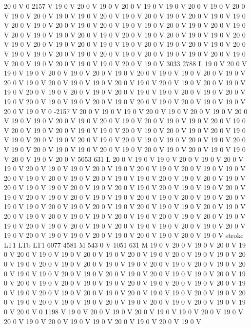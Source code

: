 {{20 0 V
0 2157 V
19 0 V
20 0 V
19 0 V
20 0 V
19 0 V
19 0 V
20 0 V
19 0 V
20 0 V
19 0 V
20 0 V
19 0 V
19 0 V
20 0 V
19 0 V
20 0 V
19 0 V
20 0 V
19 0 V
19 0 V
20 0 V
19 0 V
20 0 V
19 0 V
20 0 V
19 0 V
19 0 V
20 0 V
19 0 V
20 0 V
19 0 V
20 0 V
19 0 V
19 0 V
20 0 V
19 0 V
20 0 V
19 0 V
20 0 V
19 0 V
19 0 V
20 0 V
19 0 V
20 0 V
19 0 V
20 0 V
19 0 V
19 0 V
20 0 V
19 0 V
20 0 V
19 0 V
20 0 V
19 0 V
19 0 V
20 0 V
19 0 V
20 0 V
19 0 V
20 0 V
19 0 V
19 0 V
20 0 V
19 0 V
20 0 V
19 0 V
20 0 V
19 0 V
19 0 V
20 0 V
19 0 V
3033 2788 L
19 0 V
20 0 V
19 0 V
19 0 V
20 0 V
19 0 V
20 0 V
19 0 V
20 0 V
19 0 V
19 0 V
20 0 V
19 0 V
20 0 V
19 0 V
20 0 V
19 0 V
19 0 V
20 0 V
19 0 V
20 0 V
19 0 V
20 0 V
19 0 V
19 0 V
20 0 V
19 0 V
20 0 V
19 0 V
20 0 V
19 0 V
19 0 V
20 0 V
19 0 V
20 0 V
19 0 V
20 0 V
19 0 V
19 0 V
20 0 V
19 0 V
20 0 V
19 0 V
20 0 V
19 0 V
19 0 V
20 0 V
19 0 V
0 -2157 V
20 0 V
19 0 V
19 0 V
20 0 V
19 0 V
20 0 V
19 0 V
20 0 V
19 0 V
19 0 V
20 0 V
19 0 V
20 0 V
19 0 V
20 0 V
19 0 V
19 0 V
20 0 V
19 0 V
20 0 V
19 0 V
20 0 V
19 0 V
19 0 V
20 0 V
19 0 V
20 0 V
19 0 V
20 0 V
19 0 V
19 0 V
20 0 V
19 0 V
20 0 V
19 0 V
20 0 V
19 0 V
19 0 V
20 0 V
19 0 V
20 0 V
19 0 V
20 0 V
19 0 V
19 0 V
20 0 V
19 0 V
20 0 V
19 0 V
20 0 V
19 0 V
19 0 V
20 0 V
19 0 V
20 0 V
5053 631 L
20 0 V
19 0 V
19 0 V
20 0 V
19 0 V
20 0 V
19 0 V
20 0 V
19 0 V
19 0 V
20 0 V
19 0 V
20 0 V
19 0 V
20 0 V
19 0 V
19 0 V
20 0 V
19 0 V
20 0 V
19 0 V
20 0 V
19 0 V
19 0 V
20 0 V
19 0 V
20 0 V
19 0 V
20 0 V
19 0 V
19 0 V
20 0 V
19 0 V
20 0 V
19 0 V
20 0 V
19 0 V
19 0 V
20 0 V
19 0 V
20 0 V
19 0 V
20 0 V
19 0 V
19 0 V
20 0 V
19 0 V
20 0 V
19 0 V
20 0 V
19 0 V
19 0 V
20 0 V
19 0 V
20 0 V
19 0 V
20 0 V
19 0 V
19 0 V
20 0 V
19 0 V
20 0 V
19 0 V
20 0 V
19 0 V
19 0 V
20 0 V
19 0 V
20 0 V
19 0 V
20 0 V
19 0 V
19 0 V
20 0 V
19 0 V
20 0 V
19 0 V
20 0 V
19 0 V
19 0 V
20 0 V
19 0 V
20 0 V
19 0 V
20 0 V
19 0 V
19 0 V
20 0 V
19 0 V
20 0 V
19 0 V
20 0 V
19 0 V
stroke
LT1
LTb
LT1
6077 4581 M
543 0 V
1051 631 M
19 0 V
20 0 V
19 0 V
20 0 V
19 0 V
20 0 V
19 0 V
19 0 V
20 0 V
19 0 V
20 0 V
19 0 V
20 0 V
19 0 V
19 0 V
20 0 V
19 0 V
20 0 V
19 0 V
20 0 V
19 0 V
19 0 V
20 0 V
19 0 V
20 0 V
19 0 V
20 0 V
19 0 V
19 0 V
20 0 V
19 0 V
20 0 V
19 0 V
20 0 V
19 0 V
19 0 V
20 0 V
19 0 V
20 0 V
19 0 V
20 0 V
19 0 V
19 0 V
20 0 V
19 0 V
20 0 V
19 0 V
20 0 V
19 0 V
19 0 V
20 0 V
19 0 V
20 0 V
19 0 V
20 0 V
19 0 V
19 0 V
20 0 V
19 0 V
20 0 V
19 0 V
20 0 V
19 0 V
19 0 V
20 0 V
19 0 V
20 0 V
19 0 V
20 0 V
19 0 V
19 0 V
20 0 V
0 1198 V
19 0 V
20 0 V
19 0 V
20 0 V
19 0 V
19 0 V
20 0 V
19 0 V
20 0 V
19 0 V
20 0 V
19 0 V
19 0 V
20 0 V
19 0 V
20 0 V
19 0 V
}}
